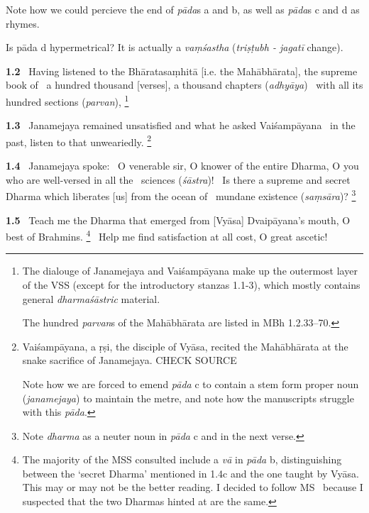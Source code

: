 \documentclass{article}
\newcommand{\skt}[1]{\textit{#1}}
\begin{document}
{                Note how we could percieve the end of \skt{pāda}s a and b,                 as well as \skt{pāda}s c and d as rhymes.                

                Is pāda d hypermetrical? It is actually a \skt{vaṃśastha} (\skt{triṣṭubh - jagatī} change).                 }%


\textbf{1.2}%
\ Having listened to the Bhāratasaṃhitā [i.e. the Mahābhārata], the supreme book of%
\               a hundred thousand [verses], a thousand chapters (\skt{adhyāya})%
\ with all its hundred sections (\skt{parvan}),%
\footnote{The dialouge of Janamejaya and Vaiśampāyana make up the outermost layer of the VSS                 (except for the introductory stanzas 1.1-3), which mostly contains                 general \skt{dharmaśāstric} material.                

                The hundred \skt{parvan}s of the Mahābhārata are listed in MBh 1.2.33--70. }%


\textbf{1.3}%
\ Janamejaya remained unsatisfied and what he asked Vaiśampāyana%
\ in the past, listen to that unweariedly.%
\footnote{Vaiśampāyana, a ṛṣi, the disciple of Vyāsa, recited the Mahābhārata at the snake sacrifice of                 Janamejaya. CHECK SOURCE                 

                Note how we are forced to emend \skt{pāda} c to contain a stem form proper noun (\skt{janamejaya})                to maintain the metre, and note how the manuscripts struggle with this \skt{pāda}.         }%


\textbf{1.4}%
\ Janamejaya spoke:%
\ O venerable sir, O knower of the entire Dharma, O you who are well-versed in all the%
\                 sciences (\skt{śāstra})!%
\ Is there a supreme and secret Dharma which liberates [us] from the ocean of%
\                         mundane existence (\skt{saṃsāra})?%
\footnote{Note \skt{dharma} as a neuter noun in \skt{pāda} c and in the next verse. }%


\textbf{1.5}%
\ Teach me the Dharma that emerged from [Vyāsa] Dvaipāyana's mouth, O best of Brahmins.%
\footnote{The majority of the MSS consulted include a \skt{vā} in \skt{pāda} b,                 distinguishing between the `secret Dharma' mentioned in 1.4c and                the one taught by Vyāsa. This may or may not be the better reading.                I decided to follow MS \msCb\ because I suspected that the two Dharmas                hinted at are the same. }%
\ Help me find satisfaction at all cost, O great ascetic!%
\end{document}
